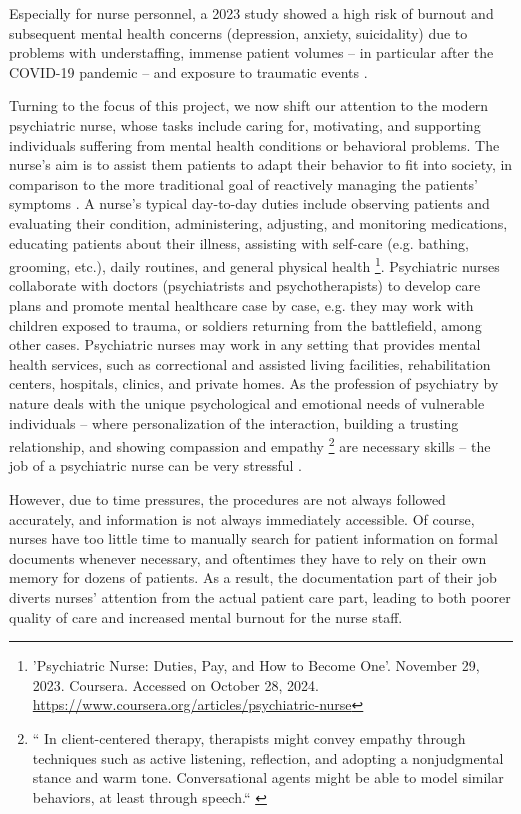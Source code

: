 Especially for nurse personnel, a 2023 study showed a high risk of burnout and subsequent mental health concerns (depression, anxiety, suicidality) due to problems with understaffing, immense patient volumes -- in particular after the COVID-19 pandemic -- and exposure to traumatic events \cite{nursesburnout2024}.

Turning to the focus of this project, we now shift our attention to the modern psychiatric nurse, whose tasks include caring for, motivating, and supporting individuals suffering from mental health conditions or behavioral problems. The nurse's aim is to assist them patients to adapt their behavior to fit into society, in comparison to the more traditional goal of reactively managing the patients' symptoms \cite{understandingnursing2019}. A nurse's typical day-to-day duties include observing patients and evaluating their condition, administering, adjusting, and monitoring medications, educating patients about their illness, assisting with self-care (e.g. bathing, grooming, etc.), daily routines, and general physical health \footnote{'Psychiatric Nurse: Duties, Pay, and How to Become One'. November 29, 2023. Coursera. Accessed on October 28, 2024. \url{https://www.coursera.org/articles/psychiatric-nurse}}. Psychiatric nurses collaborate with doctors (psychiatrists and psychotherapists) to develop care plans and promote mental healthcare case by case, e.g. they may work with children exposed to trauma, or soldiers returning from the battlefield, among other cases. Psychiatric nurses may work in any setting that provides mental health services, such as correctional and assisted living facilities, rehabilitation centers, hospitals, clinics, and private homes. As the profession of psychiatry by nature deals with the unique psychological and emotional needs of vulnerable individuals -- where personalization of the interaction, building a trusting relationship, and showing compassion and empathy \footnote{`` In client-centered therapy, therapists might convey empathy through techniques such as active listening, reflection, and adopting a nonjudgmental stance and warm tone. Conversational agents might be able to model similar behaviors, at least through speech.`` \cite{artificialempathy2018}} are necessary skills -- the job of a psychiatric nurse can be very stressful \cite{understandingnursing2019}.

However, due to time pressures, the procedures are not always followed accurately, and information is not always immediately accessible. Of course, nurses have too little time to manually search for patient information on formal documents whenever necessary, and oftentimes they have to rely on their own memory for dozens of patients. As a result, the documentation part of their job diverts nurses' attention from the actual patient care part, leading to both poorer quality of care and increased mental burnout for the nurse staff. 

